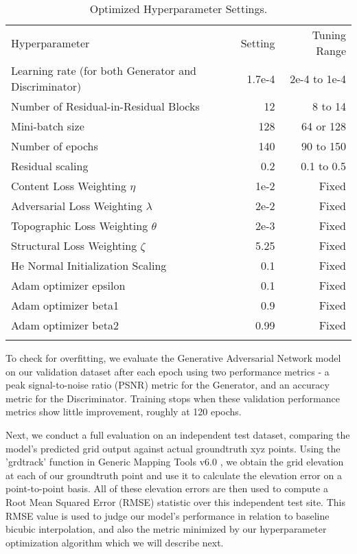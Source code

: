 \documentclass[tc, manuscript]{copernicus}
\begin{document}
\begin{table*}[htbp]
  \caption{Optimized Hyperparameter Settings.}
  \label{table:B1}
  \begin{tabular}{lrr}
  \tophline
  Hyperparameter & Setting & Tuning Range \\
  \middlehline
  Learning rate (for both Generator and Discriminator) & 1.7e-4 & 2e-4 to 1e-4 \\
  Number of Residual-in-Residual Blocks & 12 & 8 to 14 \\
  Mini-batch size & 128 & 64 or 128 \\
  Number of epochs & 140 & 90 to 150 \\
  Residual scaling & 0.2 & 0.1 to 0.5 \\
  Content Loss Weighting $\eta$ & 1e-2 & Fixed \\
  Adversarial Loss Weighting $\lambda$ & 2e-2 & Fixed \\
  Topographic Loss Weighting $\theta$ & 2e-3 & Fixed \\
  Structural Loss Weighting $\zeta$ & 5.25 & Fixed \\
  He Normal Initialization Scaling & 0.1 & Fixed \\
  Adam optimizer epsilon & 0.1 & Fixed \\
  Adam optimizer beta1 & 0.9 & Fixed \\
  Adam optimizer beta2 & 0.99 & Fixed \\
  \bottomhline
  \end{tabular}
  \belowtable{} %
\end{table*}

To check for overfitting, we evaluate the Generative Adversarial Network model on our validation dataset after each epoch using two performance metrics - a peak signal-to-noise ratio (PSNR) metric for the Generator, and an accuracy metric for the Discriminator.
Training stops when these validation performance metrics show little improvement, roughly at 120 epochs.

Next, we conduct a full evaluation on an independent test dataset, comparing the model's predicted grid output against actual groundtruth xyz points.
Using the 'grdtrack' function in Generic Mapping Tools v6.0 \citep{WesselGenericMappingTools2019}, we obtain the grid elevation at each of our groundtruth point and use it to calculate the elevation error on a point-to-point basis.
All of these elevation errors are then used to compute a Root Mean Squared Error (RMSE) statistic over this independent test site.
This RMSE value is used to judge our model's performance in relation to baseline bicubic interpolation, and also the metric minimized by our hyperparameter optimization algorithm which we will describe next.
\end{document}
